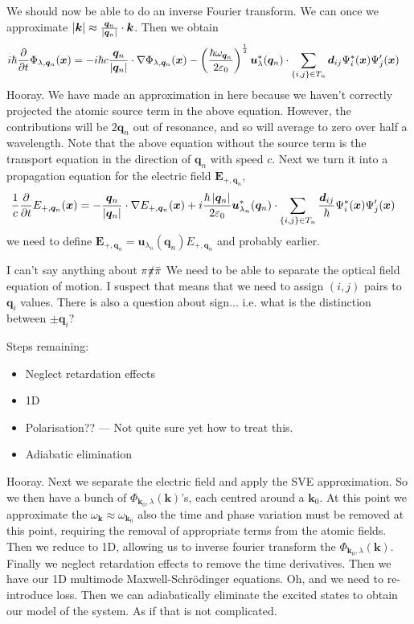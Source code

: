 We should now be able to do an inverse Fourier transform. We can once we approximate $\left|\bm{k}\right| \approx \frac{\bm{q}_n}{\left|\bm{q}_n\right|} \cdot \bm{k}$. Then we obtain
\begin{align}
    i \hbar \frac{\partial}{\partial t} \Phi_{\lambda, \bm{q}_n}(\bm{x}) &= -i \hbar c \frac{\bm{q}_n}{\left|\bm{q}_n\right|} \cdot \nabla \Phi_{\lambda, \bm{q}_n}(\bm{x}) - \left(\frac{\hbar \omega_{\bm{q}_n}}{2\varepsilon_0}\right)^{\frac{1}{2}} \bm{u}_{\lambda}^*(\bm{q}_n) \cdot \sum_{\{i,j\} \in T_n} \bm{d}_{ij} \Psi^*_i(\bm{x}) \Psi'_j(\bm{x})
\end{align}
Hooray.  We have made an approximation in here because we haven't correctly projected the atomic source term in the above equation.  However, the contributions will be $2 \bm{q}_n$ out of resonance, and so will average to zero over half a wavelength. Note that the above equation without the source term is the transport equation in the direction of ${\bm{q}_n}$ with speed $c$.  Next we turn it into a propagation equation for the electric field $\bm{E}_{+,\bm{q}_n}$,
\begin{align}
    \frac{1}{c} \frac{\partial}{\partial t} E_{+, \bm{q}_n} (\bm{x}) &= - \frac{\bm{q}_n}{\left|\bm{q}_n\right|} \cdot \nabla E_{+, \bm{q}_n}(\bm{x}) + i \frac{\hbar \left|\bm{q}_n\right|}{2 \varepsilon_0} \bm{u}^*_{\lambda_n}(\bm{q}_n) \cdot \sum_{\{i,j\}\in T_n} \frac{\bm{d}_{ij}}{\hbar} \Psi^*_i(\bm{x}) \Psi'_j(\bm{x})
\end{align}
we need to define $\bm{E}_{+, \bm{q}_n} = \bm{u}_{\lambda_n}(\bm{q}_n) E_{+, \bm{q}_n}$ and probably earlier.

I can't say anything about ${\pi\slashed{\pi}}\bar{\pi}$ We need to be able to separate the optical field equation of motion.  I suspect that means that we need to assign $\left(i, j\right)$ pairs to $\bm{q}_i$ values.  There is also a question about sign... i.e. what is the distinction between $\pm \bm{q}_i$?



Steps remaining:
\begin{itemize}
    \item Neglect retardation effects
    \item 1D
    \item Polarisation?? --- Not quite sure yet how to treat this.
    \item Adiabatic elimination
\end{itemize}

Hooray.  Next we separate the electric field and apply the SVE approximation. So we then have a bunch of $\Phi_{\bm{k}_0,\lambda}(\bm{k})$'s, each centred around a $\bm{k}_0$. At this point we approximate the $\omega_{\bm{k}}\approx \omega_{\bm{k}_0}$ also the time and phase variation must be removed at this point, requiring the removal of appropriate terms from the atomic fields.  Then we reduce to 1D, allowing us to inverse fourier transform the $\Phi_{\bm{k}_0, \lambda}(\bm{k})$.  Finally we neglect retardation effects to remove the time derivatives.  Then we have our 1D multimode Maxwell-Schrödinger equations.  Oh, and we need to re-introduce loss.  Then we can adiabatically eliminate the excited states to obtain our model of the system.  As if that is not complicated.

